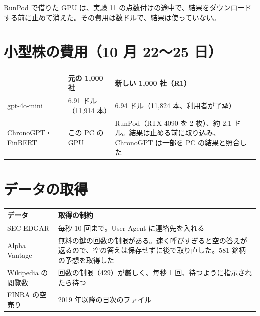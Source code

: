 RunPod で借りた GPU は、実験 11 の点数付けの途中で、結果をダウンロードする前に止めて消えた。その費用は数ドルで、結果は使っていない。

\section{小型株の費用（10 月 22〜25 日）}

\begin{longtable}{P{5.6cm}P{4.4cm}P{4.4cm}}
\toprule
 & \textbf{元の 1,000 社} & \textbf{新しい 1,000 社（R1）} \\
\midrule
\endhead
\bottomrule
\endfoot
gpt-4o-mini & 6.91 ドル（11,914 本） & 6.94 ドル（11,824 本、利用者が了承） \\
ChronoGPT・FinBERT & この PC の GPU & RunPod（RTX 4090 を 2 枚）、約 2.1 ドル。結果は止める前に取り込み、ChronoGPT は一部を PC の結果と照合した \\
\end{longtable}

\section{データの取得}

\begin{longtable}{P{4.4cm}P{10.0cm}}
\toprule
\textbf{データ} & \textbf{取得の制約} \\
\midrule
\endhead
\bottomrule
\endfoot
SEC EDGAR & 毎秒 10 回まで。User-Agent に連絡先を入れる \\
Alpha Vantage & 無料の鍵の回数の制限がある。速く呼びすぎると空の答えが返るので、空の答えは保存せずに後で取り直した。581 銘柄の予想を取得した \\
Wikipedia の閲覧数 & 回数の制限（429）が厳しく、毎秒 1 回、待つように指示されたら待つ \\
FINRA の空売り & 2019 年以降の日次のファイル \\
\end{longtable}
